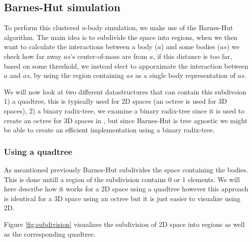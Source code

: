 \subsection{Barnes-Hut simulation}
To perform this clustered \textit{n}-body simulation, we make use of the
Barnes-Hut algorithm\cite{BH-algo}. The main idea is to subdivide the space into
regions, when we then want to calculate the interactions between a body ($a$)
and some bodies ($as$) we check how far away $as$'s center-of-mass are from $a$,
if this distance
is too far, based on some threshold, we instead elect to apporximate the
interaction between $a$ and $as$, by using the region containing $as$ as a
single body representation of $as$.

We will now look at two different datastructures that can contain this subdivsion
1) a quadtree, this is typically used for 2D spaces (an octree is used for 3D
spaces), 2) a binary radix-tree, we examine a binary radix-tree since it is used
to create an octree for 3D spaces in \cite{main-ref}, but since Barnes-Hut is
tree agnostic we might be able to create an efficient implementation using a
binary radix-tree.

\subsubsection{Using a quadtree}
As meantioned previously Barnes-Hut subdivides the space containing the bodies.
This is done untill a region of the subdivision contains $0$ or $1$ elements.
We will here describe how it works for a 2D space using a quadtree however this
approach is identical for a 3D space using an octree but it is just easier to
visualize using 2D.

Figure \ref{fig:subdivision} visualizes the subdivision of 2D space into regions
as well as the corresponding quadtree.

